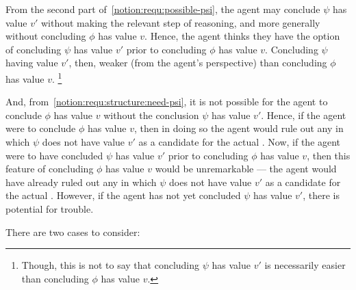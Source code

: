 \begin{note}[\ref{notion:requ:structure:psi}]
  From the second part of~\ref{notion:requ:possible-psi}, the agent may conclude \(\psi\) has value \(v'\) without making the relevant step of reasoning, and more generally without concluding \(\phi\) has value \(v\).
  Hence, the agent thinks they have the option of concluding \(\psi\) has value \(v'\) prior to concluding \(\phi\) has value \(v\).
  Concluding \(\psi\) having value \(v'\), then, weaker (from the agent's perspective) than concluding \(\phi\) has value \(v\).\nolinebreak
  \footnote{
    Though, this is not to say that concluding \(\psi\) has value \(v'\) is necessarily easier than concluding \(\phi\) has value \(v\).
  }

  And, from~\ref{notion:requ:structure:need-psi}, it is not possible for the agent to conclude \(\phi\) has value \(v\) without the conclusion \indicateV{} \(\psi\) has value \(v'\).
  Hence, if the agent were to conclude \(\phi\) has value \(v\), then in doing so the agent would rule out any \world{} in which \(\psi\) does not have value \(v'\) as a candidate for the actual \world{}.
  Now, if the agent were to have concluded \(\psi\) has value \(v'\) prior to concluding \(\phi\) has value \(v\), then this feature of concluding \(\phi\) has value \(v\) would be unremarkable --- the agent would have already ruled out any \world{} in which \(\psi\) does not have value \(v'\) as a candidate for the actual \world{}.
  However, if the agent has not yet concluded \(\psi\) has value \(v'\), there is potential for trouble.

  There are two cases to consider:
\end{note}

